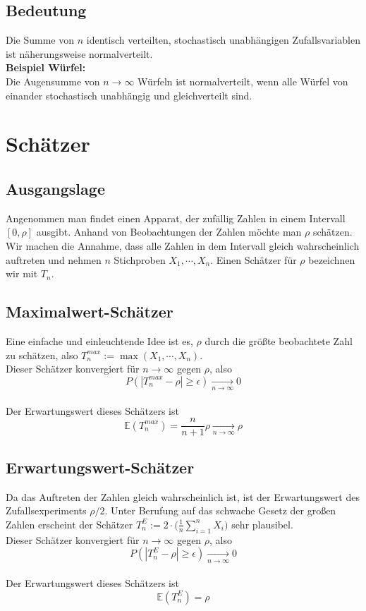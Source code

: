 \documentclass[a4paper]{article}
\begin{document}
\subsection{Bedeutung}
Die Summe von $n$ identisch verteilten, stochastisch unabhängigen Zufallsvariablen ist näherungsweise normalverteilt.\\

\textbf{Beispiel Würfel:}\\
Die Augensumme von $n \to \infty$ Würfeln ist normalverteilt, wenn alle Würfel von einander stochastisch unabhängig und gleichverteilt sind.

\pagebreak
\section{Schätzer}

\subsection{Ausgangslage}
Angenommen man findet einen Apparat, der zufällig Zahlen in einem Intervall $[0, \rho]$ ausgibt. Anhand von Beobachtungen der Zahlen möchte man $\rho$ schätzen. Wir machen die Annahme, dass alle Zahlen in dem Intervall gleich wahrscheinlich auftreten und  nehmen $n$ Stichproben $X_1, \cdots, X_n$. Einen Schätzer für $\rho$ bezeichnen wir mit $T_n$.

\subsection{Maximalwert-Schätzer}
Eine einfache und einleuchtende Idee ist es, $\rho$ durch die größte beobachtete Zahl zu schätzen, also
$T_n^{max} := \max(X_1, \cdots, X_n)$.\\
Dieser Schätzer konvergiert für $n \to \infty$ gegen $\rho$, also $$P(| T_n^{max} - \rho | \geq \epsilon) \underset{n \to \infty}{\longrightarrow} 0$$\\
Der Erwartungswert dieses Schätzers ist $$ \mathbb{E}(T_n^{max} ) = \frac{n}{n+1} \rho    \underset{n \to \infty}{\longrightarrow} \rho$$


\subsection{Erwartungswert-Schätzer}
Da das Auftreten der Zahlen gleich wahrscheinlich ist, ist der Erwartungswert des Zufallsexperiments $\rho /2$. Unter Berufung auf das  schwache Gesetz der großen Zahlen erscheint der Schätzer
$T_n^{E} :=  2 \cdot \biggl( \frac{1}{n} \sum_{i=1}^n X_i \biggr)$ sehr plausibel.\\
Dieser Schätzer konvergiert für $n \to \infty$ gegen $\rho$, also $$P(| T_n^{E} - \rho | \geq \epsilon) \underset{n \to \infty}{\longrightarrow} 0$$\\
Der Erwartungswert dieses Schätzers ist $$ \mathbb{E}(T_n^{E} ) = \rho$$
\end{document}
